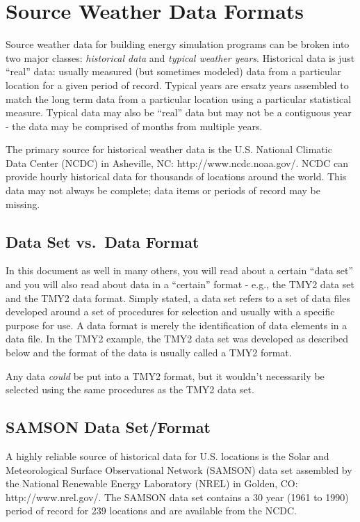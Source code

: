 \section{Source Weather Data Formats}\label{source-weather-data-formats}

Source weather data for building energy simulation programs can be broken into two major classes: \emph{historical data} and \emph{typical weather years}. Historical data is just ``real'' data: usually measured (but sometimes modeled) data from a particular location for a given period of record. Typical years are ersatz years assembled to match the long term data from a particular location using a particular statistical measure. Typical data may also be ``real'' data but may not be a contiguous year - the data may be comprised of months from multiple years.

The primary source for historical weather data is the U.S. National Climatic Data Center (NCDC) in Asheville, NC: http://www.ncdc.noaa.gov/. NCDC can provide hourly historical data for thousands of locations around the world. This data may not always be complete; data items or periods of record may be missing.

\subsection{Data Set vs.~Data Format}\label{data-set-vs.data-format}

In this document as well in many others, you will read about a certain ``data set'' and you will also read about data in a ``certain'' format - e.g., the TMY2 data set and the TMY2 data format. Simply stated, a data set refers to a set of data files developed around a set of procedures for selection and usually with a specific purpose for use. A data format is merely the identification of data elements in a data file. In the TMY2 example, the TMY2 data set was developed as described below and the format of the data is usually called a TMY2 format.

Any data \emph{could} be put into a TMY2 format, but it wouldn't necessarily be selected using the same procedures as the TMY2 data set.

\subsection{SAMSON Data Set/Format}\label{samson-data-setformat}

A highly reliable source of historical data for U.S. locations is the Solar and Meteorological Surface Observational Network (SAMSON) data set assembled by the National Renewable Energy Laboratory (NREL) in Golden, CO: http://www.nrel.gov/. The SAMSON data set contains a 30 year (1961 to 1990) period of record for 239 locations and are available from the NCDC.

